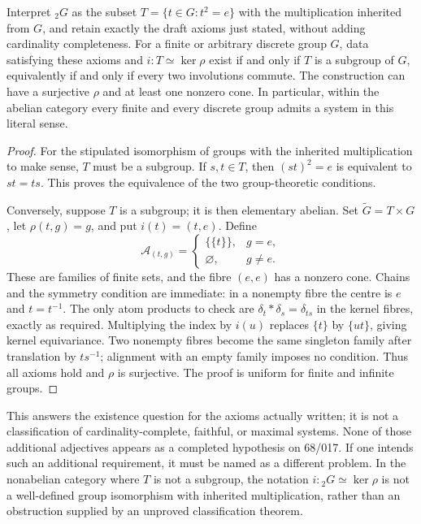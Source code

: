 \begin{theorem}\label{C-literal-class}
Interpret ${}_2G$ as the subset $T=\{t\in G:t^2=e\}$ with the multiplication
inherited from $G$, and retain exactly the draft axioms just stated,
without adding cardinality completeness. For a finite or arbitrary
discrete group $G$, data satisfying these axioms and
$i:T\simeq\ker\rho$ exist if and only if $T$ is a subgroup of $G$,
equivalently if and only if every two involutions commute. The construction
can have a surjective $\rho$ and at least one nonzero cone. In particular,
within the abelian category every finite and every discrete group admits
a system in this literal sense.
\end{theorem}
\begin{proof}
For the stipulated isomorphism of groups with the inherited multiplication
to make sense, $T$ must be a subgroup. If $s,t\in T$, then
$(st)^2=e$ is equivalent to $st=ts$. This proves the equivalence of the
two group-theoretic conditions.

Conversely, suppose $T$ is a subgroup; it is then elementary abelian.
Set $\widetilde G=T\times G$, let $\rho(t,g)=g$, and put
$i(t)=(t,e)$. Define
\[
 \mathcal A_{(t,g)}=
 \begin{cases}
 \{\{t\}\},&g=e,\\
 \varnothing,&g\ne e.
 \end{cases}
\]
These are families of finite sets, and the fibre $(e,e)$ has a nonzero
cone. Chains and the symmetry condition are immediate: in a nonempty
fibre the centre is $e$ and $t=t^{-1}$.
The only atom products to check are
$\delta_t*\delta_s=\delta_{ts}$ in the kernel fibres, exactly as required.
Multiplying the index by $i(u)$ replaces $\{t\}$ by $\{ut\}$, giving
kernel equivariance. Two nonempty fibres become the same singleton family
after translation by $ts^{-1}$; alignment with an empty family imposes no
condition. Thus all axioms hold and $\rho$ is surjective.
The proof is uniform for finite and infinite groups.
\end{proof}

This answers the existence question for the axioms actually written; it
is not a classification of cardinality-complete, faithful, or maximal
systems. None of those additional adjectives appears as a completed
hypothesis on 68/017. If one intends such an additional requirement, it
must be named as a different problem. In the nonabelian category where
$T$ is not a subgroup, the notation $i:{}_2G\simeq\ker\rho$ is not a
well-defined group isomorphism with inherited multiplication, rather than
an obstruction supplied by an unproved classification theorem.

